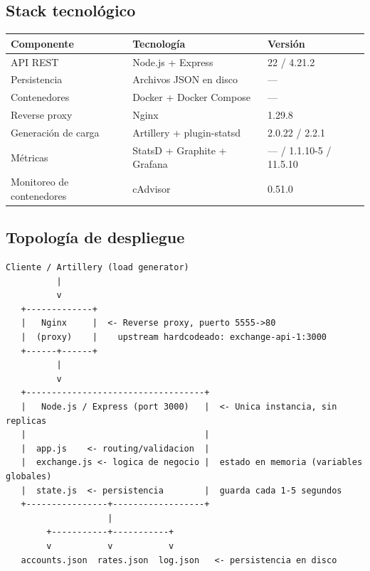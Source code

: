 \subsection{Stack tecnológico}

\begin{table}[h!]
\centering
\begin{tabular}{lll}
\toprule
\textbf{Componente} & \textbf{Tecnología} & \textbf{Versión} \\
\midrule
API REST & Node.js + Express & 22 / 4.21.2 \\
Persistencia & Archivos JSON en disco & — \\
Contenedores & Docker + Docker Compose & — \\
Reverse proxy & Nginx & 1.29.8 \\
Generación de carga & Artillery + plugin-statsd & 2.0.22 / 2.2.1 \\
Métricas & StatsD + Graphite + Grafana & — / 1.1.10-5 / 11.5.10 \\
Monitoreo de contenedores & cAdvisor & 0.51.0 \\
\bottomrule
\end{tabular}
\end{table}

\subsection{Topología de despliegue}

\begin{center}
\begin{tcolorbox}[
  breakable,
  colback=white,
  colframe=black,
  boxrule=0.5pt
]
\begin{verbatim}
Cliente / Artillery (load generator)
          |
          v
   +-------------+
   |   Nginx     |  <- Reverse proxy, puerto 5555->80
   |  (proxy)    |    upstream hardcodeado: exchange-api-1:3000
   +------+------+
          |
          v
   +-----------------------------------+
   |   Node.js / Express (port 3000)   |  <- Unica instancia, sin replicas
   |                                   |
   |  app.js    <- routing/validacion  |
   |  exchange.js <- logica de negocio |  estado en memoria (variables globales)
   |  state.js  <- persistencia        |  guarda cada 1-5 segundos
   +----------------+------------------+
                    |
        +-----------+-----------+
        v           v           v
   accounts.json  rates.json  log.json   <- persistencia en disco
\end{verbatim}
\end{tcolorbox}
\label{diag:monolito_1}
\end{center}


